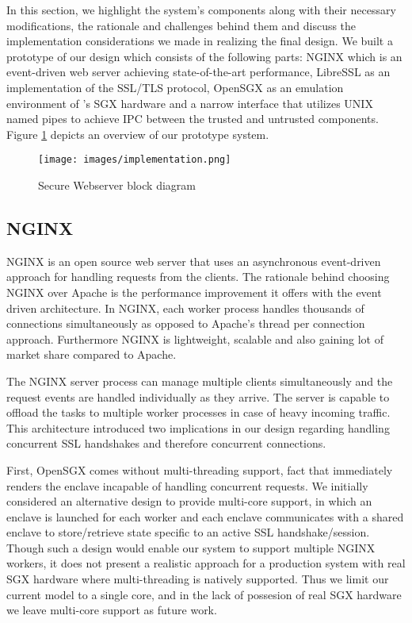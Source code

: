 \documentclass[../main.tex]{subfiles}
\begin{document}
In this section, we highlight the system's components along with their
necessary modifications, the rationale and challenges behind them and discuss
the implementation considerations we made in realizing the final design. We
built a prototype of our design which consists of the following parts: NGINX
which is an event-driven web server achieving state-of-the-art performance,
LibreSSL as an implementation of the SSL/TLS protocol, OpenSGX as an emulation
environment of \Intel's SGX hardware and a narrow interface that utilizes UNIX
named pipes to achieve IPC between the trusted and untrusted components. Figure
\ref{fig:implementation-overview} depicts an overview of our prototype system.

\begin{figure}[H]
  \centering
  \texttt{[image: images/implementation.png]}
  \caption{Secure Webserver block diagram }
  \label{fig:implementation-overview}
\end{figure}

\subsection{NGINX}

NGINX is an open source web server that uses an asynchronous event-driven
approach for handling requests from the clients. The rationale behind choosing
NGINX over Apache is the performance improvement it offers with the event
driven architecture. In NGINX, each worker process handles thousands of
connections simultaneously as opposed to Apache's thread per connection
approach. Furthermore NGINX is lightweight, scalable and also gaining lot of
market share compared to Apache.

The NGINX server process can manage multiple clients simultaneously and the
request events are handled individually as they arrive. The server is capable
to offload the tasks to multiple worker processes in case of heavy incoming
traffic. This architecture introduced two implications in our design regarding
handling concurrent SSL handshakes and therefore concurrent connections.

First, OpenSGX comes without multi-threading support, fact that immediately
renders the enclave incapable of handling concurrent requests. We initially
considered an alternative design to provide multi-core support, in which an
enclave is launched for each worker and each enclave communicates with a shared
enclave to store/retrieve state specific to an active SSL handshake/session.
Though such a design would enable our system to support multiple NGINX workers,
it does not present a realistic approach for a production system with real SGX
hardware where multi-threading is natively supported. Thus we limit our current
model to a single core, and in the lack of possesion of real SGX hardware we
leave multi-core support as future work.
\end{document}
